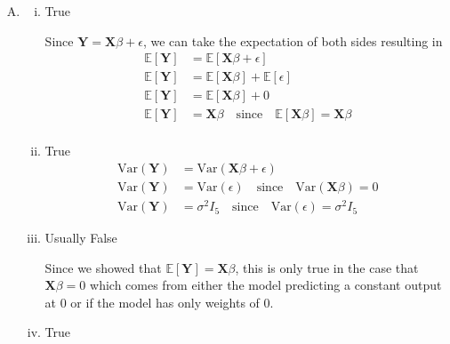 \documentclass[12pt,letterpaper, onecolumn]{exam}
\begin{document}
\begin{questions}
\begin{solution}
\begin{enumerate}[A.)]
\begin{equation*}
\begin{array}{ccccc}
                1 & 1 &  1 & 1 & 1 \\ 0 & 1 & 2 & 3 & 4
            \end{array} \right]  \left [\begin{array}{c}
                2  \\
                4  \\
                5  \\
                8  \\
                9 
            \end{array} \right] = \left [\begin{array}{c}
                28 \\ 74
            \end{array} \right]
        \end{equation*}
        \item \begin{enumerate}[i.)]
            \item True
            
            Since $\textbf{Y}=\textbf{X}\beta + \epsilon$, we can take the expectation of both sides resulting in
            \begin{align*}
                \mathbb{E}[\textbf{Y}] & = \mathbb{E}[\textbf{X}\beta + \epsilon] \\
                \mathbb{E}[\textbf{Y}] & = \mathbb{E}[\textbf{X}\beta] +\mathbb{E}[ \epsilon] \\
                \mathbb{E}[\textbf{Y}] & = \mathbb{E}[\textbf{X}\beta] + 0 \\
                \mathbb{E}[\textbf{Y}] & = \textbf{X}\beta \quad \text{since} \quad \mathbb{E}[\textbf{X}\beta] = \textbf{X}\beta \\
            \end{align*}
            \item True
            \begin{align*}
                \text{Var}(\textbf{Y}) &= \text{Var}(\textbf{X}\beta + \epsilon) \\
                \text{Var}(\textbf{Y}) &= \text{Var}( \epsilon) \quad \text{since} \quad \text{Var}(\textbf{X}\beta)=0\\
                \text{Var}(\textbf{Y}) &= \sigma^2I_5 \quad \text{since} \quad \text{Var}( \epsilon) = \sigma^2I_5
            \end{align*}
            \item Usually False
            
            Since we showed that $\mathbb{E}[\textbf{Y}] = \textbf{X}\beta$, this is only true in the case that $\textbf{X}\beta = 0$ which comes from either the model predicting a constant output at 0 or if the model has only weights of 0.
            \item True
            

\end{enumerate}
\end{enumerate}
\end{solution}
\end{questions}
\end{document}
